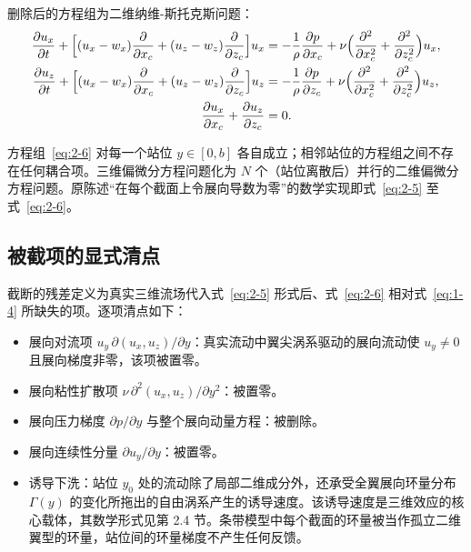 \documentclass[11pt,a4paper]{ctexart}
\numberwithin{equation}{section}
\begin{document}
删除后的方程组为二维纳维-斯托克斯问题：
\begin{subequations}\label{eq:2-6}
\begin{align}
  \frac{\partial u_x}{\partial t} + \Bigl[(u_x - w_x)\frac{\partial}{\partial x_c} + (u_z - w_z)\frac{\partial}{\partial z_c}\Bigr] u_x
  &= -\frac{1}{\rho}\frac{\partial p}{\partial x_c} + \nu\Bigl(\frac{\partial^2}{\partial x_c^2} + \frac{\partial^2}{\partial z_c^2}\Bigr) u_x, \label{eq:2-6a}\\
  \frac{\partial u_z}{\partial t} + \Bigl[(u_x - w_x)\frac{\partial}{\partial x_c} + (u_z - w_z)\frac{\partial}{\partial z_c}\Bigr] u_z
  &= -\frac{1}{\rho}\frac{\partial p}{\partial z_c} + \nu\Bigl(\frac{\partial^2}{\partial x_c^2} + \frac{\partial^2}{\partial z_c^2}\Bigr) u_z, \label{eq:2-6b}\\
  \frac{\partial u_x}{\partial x_c} + \frac{\partial u_z}{\partial z_c} &= 0. \label{eq:2-6c}
\end{align}
\end{subequations}

方程组~\eqref{eq:2-6} 对每一个站位 $y \in [0, b]$ 各自成立；相邻站位的方程组之间不存在任何耦合项。三维偏微分方程问题化为 $N$ 个（站位离散后）并行的二维偏微分方程问题。原陈述“在每个截面上令展向导数为零”的数学实现即式~\eqref{eq:2-5} 至式~\eqref{eq:2-6}。

\subsection{被截项的显式清点}

截断的残差定义为真实三维流场代入式~\eqref{eq:2-5} 形式后、式~\eqref{eq:2-6} 相对式~\eqref{eq:1-4} 所缺失的项。逐项清点如下：

\begin{itemize}
  \item 展向对流项 $u_y\,\partial(u_x, u_z)/\partial y$：真实流动中翼尖涡系驱动的展向流动使 $u_y \ne 0$ 且展向梯度非零，该项被置零。
  \item 展向粘性扩散项 $\nu\,\partial^2(u_x, u_z)/\partial y^2$：被置零。
  \item 展向压力梯度 $\partial p/\partial y$ 与整个展向动量方程：被删除。
  \item 展向连续性分量 $\partial u_y/\partial y$：被置零。
  \item 诱导下洗：站位 $y_0$ 处的流动除了局部二维成分外，还承受全翼展向环量分布 $\Gamma(y)$ 的变化所拖出的自由涡系产生的诱导速度。该诱导速度是三维效应的核心载体，其数学形式见第 2.4 节。条带模型中每个截面的环量被当作孤立二维翼型的环量，站位间的环量梯度不产生任何反馈。
\end{itemize}
\end{document}
